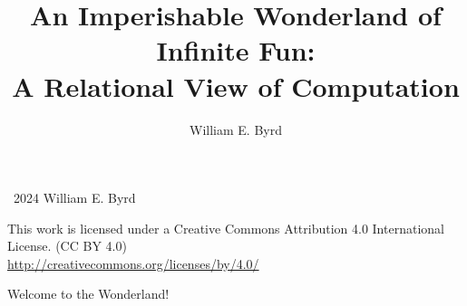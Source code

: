 \documentclass{book}
\title{An Imperishable Wonderland of Infinite Fun: \\ A Relational View of Computation}
\author{William E. Byrd}
\begin{document}
\maketitle

\noindent
\textcopyright~2024 William E. Byrd

\wspace

\noindent
\huge
\ccLogo
\ccAttribution
\large

\wspace

\noindent
This work is licensed under a Creative Commons Attribution 4.0 International License.
(CC BY 4.0) \\
\url{http://creativecommons.org/licenses/by/4.0/}

\newpage

Welcome to the Wonderland!
\end{document}
